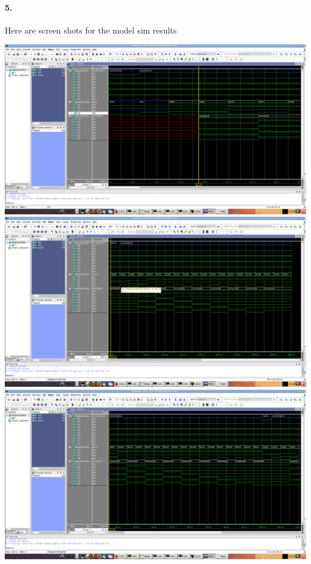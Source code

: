 \documentclass[oneside, 10pt]{article}
\begin{document}
\paragraph{5.} Here are screen shots for the model sim results
\begin{center}
    \includegraphics[scale=0.22]{not_reset.png}
    \includegraphics[scale=0.22]{asr.png}
    \includegraphics[scale=0.22]{non_asr.png} 
\end{center}
\end{document}
